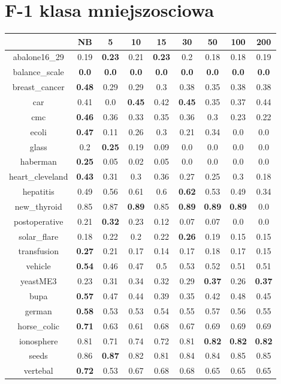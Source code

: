 \documentclass{article}%
\begin{document}
%
\section*{F{-}1 klasa mniejszosciowa}%
\begin{tabular}{c|cccccccc}%
\hline%
&NB&5&10&15&30&50&100&200\\%
\hline%
abalone16\_29&0.19&\textbf{0.23}&0.21&\textbf{0.23}&0.2&0.18&0.18&0.19\\%
\hline%
balance\_scale&\textbf{0.0}&\textbf{0.0}&\textbf{0.0}&\textbf{0.0}&\textbf{0.0}&\textbf{0.0}&\textbf{0.0}&\textbf{0.0}\\%
\hline%
breast\_cancer&\textbf{0.48}&0.29&0.29&0.3&0.38&0.35&0.38&0.38\\%
\hline%
car&0.41&0.0&\textbf{0.45}&0.42&\textbf{0.45}&0.35&0.37&0.44\\%
\hline%
cmc&\textbf{0.46}&0.36&0.33&0.35&0.36&0.3&0.23&0.22\\%
\hline%
ecoli&\textbf{0.47}&0.11&0.26&0.3&0.21&0.34&0.0&0.0\\%
\hline%
glass&0.2&\textbf{0.25}&0.19&0.09&0.0&0.0&0.0&0.0\\%
\hline%
haberman&\textbf{0.25}&0.05&0.02&0.05&0.0&0.0&0.0&0.0\\%
\hline%
heart\_cleveland&\textbf{0.43}&0.31&0.3&0.36&0.27&0.25&0.3&0.18\\%
\hline%
hepatitis&0.49&0.56&0.61&0.6&\textbf{0.62}&0.53&0.49&0.34\\%
\hline%
new\_thyroid&0.85&0.87&\textbf{0.89}&0.85&\textbf{0.89}&\textbf{0.89}&\textbf{0.89}&0.0\\%
\hline%
postoperative&0.21&\textbf{0.32}&0.23&0.12&0.07&0.07&0.0&0.0\\%
\hline%
solar\_flare&0.18&0.22&0.2&0.22&\textbf{0.26}&0.19&0.15&0.15\\%
\hline%
transfusion&\textbf{0.27}&0.21&0.17&0.14&0.17&0.18&0.17&0.15\\%
\hline%
vehicle&\textbf{0.54}&0.46&0.47&0.5&0.53&0.52&0.51&0.51\\%
\hline%
yeastME3&0.23&0.31&0.34&0.32&0.29&\textbf{0.37}&0.26&\textbf{0.37}\\%
\hline%
bupa&\textbf{0.57}&0.47&0.44&0.39&0.35&0.42&0.48&0.45\\%
\hline%
german&\textbf{0.58}&0.53&0.53&0.54&0.55&0.57&0.56&0.55\\%
\hline%
horse\_colic&\textbf{0.71}&0.63&0.61&0.68&0.67&0.69&0.69&0.69\\%
\hline%
ionosphere&0.81&0.71&0.74&0.72&0.81&\textbf{0.82}&\textbf{0.82}&\textbf{0.82}\\%
\hline%
seeds&0.86&\textbf{0.87}&0.82&0.81&0.84&0.84&0.85&0.85\\%
\hline%
vertebal&\textbf{0.72}&0.53&0.67&0.68&0.68&0.65&0.65&0.65\\%
\hline%
\end{tabular}
\end{document}
